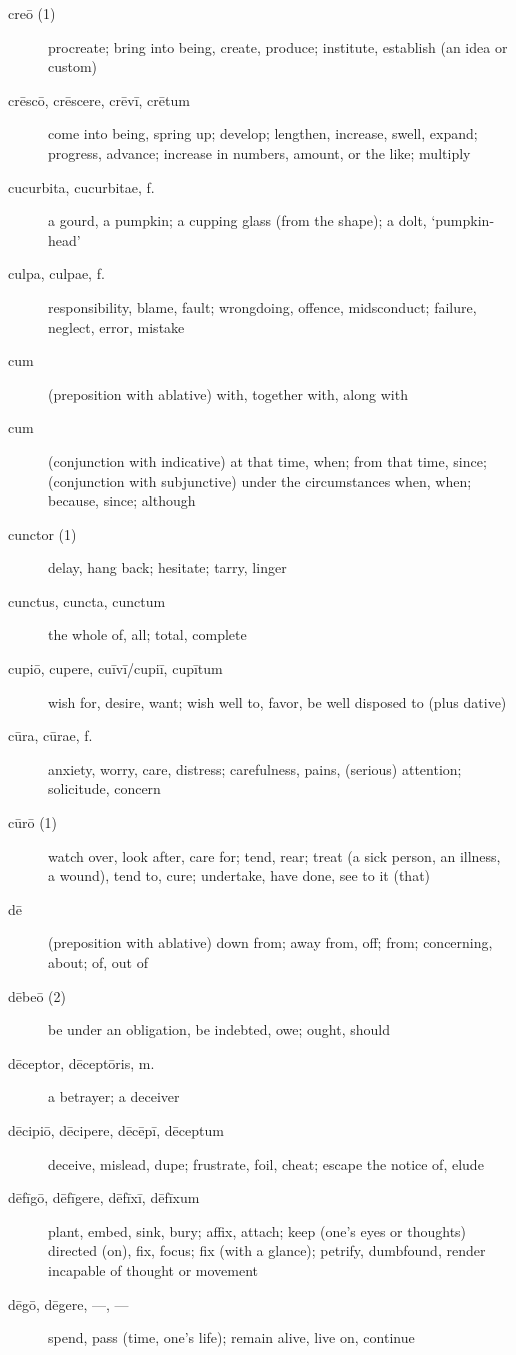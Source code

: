 \begin{description}
    \item[creō (1)] procreate; bring into being, create, produce; institute, establish (an idea or custom)
    \item[crēscō, crēscere, crēvī, crētum] come into being, spring up; develop; lengthen, increase, swell, expand; progress, advance; increase in numbers, amount, or the like; multiply
    \item[cucurbita, cucurbitae, f.] a gourd, a pumpkin; a cupping glass (from the shape); a dolt, `pumpkin-head'
    \item[culpa, culpae, f.] responsibility, blame, fault; wrongdoing, offence, midsconduct; failure, neglect, error, mistake
    \item[cum] (preposition with ablative) with, together with, along with
    \item[cum] (conjunction with indicative) at that time, when; from that time, since; (conjunction with subjunctive) under the circumstances when, when; because, since; although
    \item[cunctor (1)] delay, hang back; hesitate; tarry, linger
    \item[cunctus, cuncta, cunctum] the whole of, all; total, complete
    \item[cupiō, cupere, cuīvī/cupiī, cupītum] wish for, desire, want; wish well to, favor, be well disposed to (plus dative)
    \item[cūra, cūrae, f.] anxiety, worry, care, distress; carefulness, pains, (serious) attention; solicitude, concern
    \item[cūrō (1)] watch over, look after, care for; tend, rear; treat (a sick person, an illness, a wound), tend to, cure; undertake, have done, see to it (that)
    \item[dē] (preposition with ablative) down from; away from, off; from; concerning, about; of, out of
    \item[dēbeō (2)] be under an obligation, be indebted, owe; ought, should
    \item[dēceptor, dēceptōris, m.] a betrayer; a deceiver
    \item[dēcipiō, dēcipere, dēcēpī, dēceptum] deceive, mislead, dupe; frustrate, foil, cheat; escape the notice of, elude
    \item[dēfīgō, dēfīgere, dēfīxī, dēfīxum] plant, embed, sink, bury; affix, attach; keep (one's eyes or thoughts) directed (on), fix, focus; fix (with a glance); petrify, dumbfound, render incapable of thought or movement
    \item[dēgō, dēgere, ---, ---] spend, pass (time, one's life); remain alive, live on, continue

\end{description}
